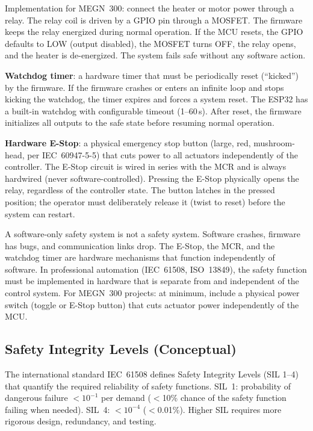 \documentclass[11pt,letterpaper,twoside,openany]{book}
\begin{document}
Implementation for MEGN~300: connect the heater or motor power through a relay. The relay coil is driven by a GPIO pin through a MOSFET. The firmware keeps the relay energized during normal operation. If the MCU resets, the GPIO defaults to LOW (output disabled), the MOSFET turns OFF, the relay opens, and the heater is de-energized. The system fails safe without any software action.

\textbf{Watchdog timer}: a hardware timer that must be periodically reset (``kicked'') by the firmware. If the firmware crashes or enters an infinite loop and stops kicking the watchdog, the timer expires and forces a system reset. The ESP32 has a built-in watchdog with configurable timeout (1--60\,s). After reset, the firmware initializes all outputs to the safe state before resuming normal operation.

\textbf{Hardware E-Stop}: a physical emergency stop button (large, red, mushroom-head, per IEC~60947-5-5) that cuts power to all actuators independently of the controller. The E-Stop circuit is wired in series with the MCR and is always hardwired (never software-controlled). Pressing the E-Stop physically opens the relay, regardless of the controller state. The button latches in the pressed position; the operator must deliberately release it (twist to reset) before the system can restart.

\begin{warningbox}
A software-only safety system is not a safety system. Software crashes, firmware has bugs, and communication links drop. The E-Stop, the MCR, and the watchdog timer are hardware mechanisms that function independently of software. In professional automation (IEC~61508, ISO~13849), the safety function must be implemented in hardware that is separate from and independent of the control system. For MEGN~300 projects: at minimum, include a physical power switch (toggle or E-Stop button) that cuts actuator power independently of the MCU.
\end{warningbox}

\subsection{Safety Integrity Levels (Conceptual)}
The international standard IEC~61508 defines Safety Integrity Levels (SIL 1--4) that quantify the required reliability of safety functions. SIL~1: probability of dangerous failure $< 10^{-1}$ per demand ($<$10\% chance of the safety function failing when needed). SIL~4: $< 10^{-4}$ ($<$0.01\%). Higher SIL requires more rigorous design, redundancy, and testing.
\end{document}
